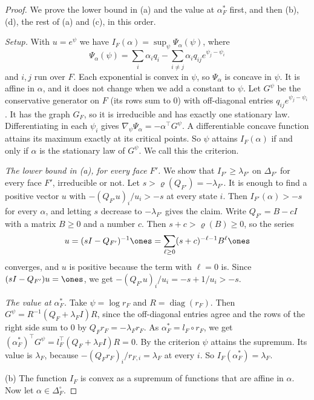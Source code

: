 \begin{proof}
We prove the lower bound in (a) and the value at $\alpha^*_F$ first, and
then (b), (d), the rest of (a) and (c), in this order.

\emph{Setup.} With $u=e^\psi$ we have $I_F(\alpha)=\sup_\psi\Psi_\alpha(\psi)$,
where
\[
\Psi_\alpha(\psi)=\sum_i\alpha_iq_i-\sum_{i\ne j}\alpha_iq_{ij}e^{\psi_j-\psi_i}
\]
and $i,j$ run over $F$. Each exponential is convex in $\psi$, so $\Psi_\alpha$
is concave in $\psi$. It is affine in $\alpha$, and it does not change when we
add a constant to $\psi$. Let $G^\psi$ be the conservative generator on $F$ (its rows sum to $0$) with
off-diagonal entries $q_{ij}e^{\psi_j-\psi_i}$. It has the graph $G_F$, so it
is irreducible and has exactly one stationary law. Differentiating in each
$\psi_i$ gives $\nabla_\psi\Psi_\alpha=-\alpha^\top G^\psi$. A differentiable
concave function attains its maximum exactly at its critical points. So $\psi$ attains
$I_F(\alpha)$ if and only if $\alpha$ is the stationary law of $G^\psi$. We
call this the criterion.

\emph{The lower bound in \textup{(a)}, for every face $F'$.} We show that
$I_{F'}\ge\lambda_{F'}$ on $\Delta_{F'}$ for every face $F'$, irreducible or
not. Let $s>\varrho(Q_{F'})=-\lambda_{F'}$. It is enough to find a positive
vector $u$ with $-(Q_{F'}u)_i/u_i>-s$ at every state $i$. Then
$I_{F'}(\alpha)>-s$ for every $\alpha$, and letting $s$ decrease to
$-\lambda_{F'}$ gives the claim. Write $Q_{F'}=B-cI$ with a matrix $B\ge0$ and
a number $c$. Then $s+c>\varrho(B)\ge0$, so the series
\[
u=(sI-Q_{F'})^{-1}\ones=\sum_{\ell\ge0}(s+c)^{-\ell-1}B^\ell\ones
\]
converges, and $u$ is positive because the term with $\ell=0$ is. Since
$(sI-Q_{F'})u=\ones$, we get $-(Q_{F'}u)_i/u_i=-s+1/u_i>-s$.

\emph{The value at $\alpha^*_F$.} Take $\psi=\log r_F$ and
$R=\operatorname{diag}(r_F)$. Then $G^\psi=R^{-1}(Q_F+\lambda_FI)R$, since the
off-diagonal entries agree and the rows of the right side sum to $0$ by
$Q_Fr_F=-\lambda_Fr_F$. As $\alpha^*_F=l_F\circ r_F$, we get
$(\alpha^*_F)^\top G^\psi=l_F^\top(Q_F+\lambda_FI)R=0$. By the criterion
$\psi$ attains the supremum. Its value is $\lambda_F$, because
$-(Q_Fr_F)_i/r_{F,i}=\lambda_F$ at every $i$. So $I_F(\alpha^*_F)=\lambda_F$.

(b) The function $I_F$ is convex as a supremum of functions that are affine in $\alpha$.
Now let $\alpha\in\Delta_F^\circ$.


\end{proof}
